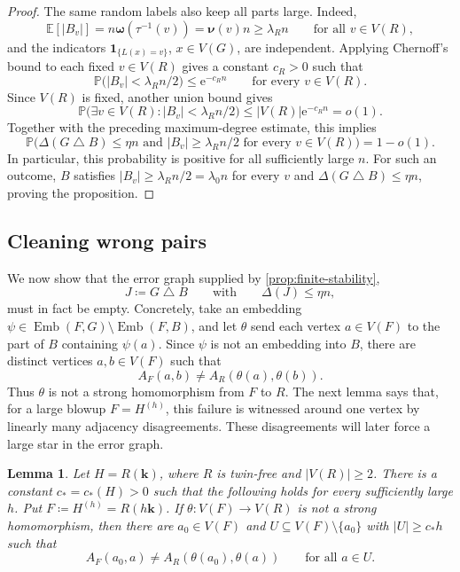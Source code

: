 \documentclass[10pt]{article}
\theoremstyle{plain}
\newtheorem{lemma}[lemma]{Lemma}
\theoremstyle{remark}
\DeclareMathOperator{\Emb}{Emb}
\newcommand{\symdiff}{\mathbin{\triangle}}
\newcommand{\bnu}{{\boldsymbol{\nu}}}
\newcommand{\bomega}{{\boldsymbol{\omega}}}
\begin{document}
\begin{proof}
The same random labels also keep all parts large. Indeed,
\[
        \mathbb E[|B_v|]=n\bomega(\tau^{-1}(v))=\bnu(v)n\ge\lambda_R n
        \qquad\text{for all }v\in V(R),
\]
and the indicators $\mathbf 1_{\{L(x)=v\}}$, $x\in V(G)$, are independent. Applying Chernoff's bound to each fixed $v\in V(R)$ gives a constant $c_R>0$ such that
\[
        \mathbb P\bigl(|B_v|<\lambda_R n/2\bigr)
        \le \mathrm{e}^{-c_R n}
        \qquad\text{for every }v\in V(R).
\]
Since $V(R)$ is fixed, another union bound gives
\[
        \mathbb P\bigl(\exists v\in V(R): |B_v|<\lambda_R n/2\bigr)
        \le |V(R)|\mathrm{e}^{-c_R n}=o(1).
\]
Together with the preceding maximum-degree estimate, this implies
\[
        \mathbb P\bigl(\Delta(G\symdiff B)\le\eta n
        \text{ and } |B_v|\ge\lambda_R n/2\text{ for every }v\in V(R)\bigr)
        =1-o(1).
\]
In particular, this probability is positive for all sufficiently large $n$. For such an outcome, $B$ satisfies $|B_v|\ge\lambda_R n/2=\lambda_0 n$ for every $v$ and $\Delta(G\symdiff B)\le\eta n$, proving the proposition.
\end{proof}

\subsection{Cleaning wrong pairs}
\label{sec:cleaning}

We now show that the error graph supplied by \cref{prop:finite-stability},
\[
        J\coloneqq G\symdiff B
        \qquad\text{with}\qquad
        \Delta(J)\le\eta n,
\]
must in fact be empty. Concretely, take an embedding $\psi\in\Emb(F,G)\setminus\Emb(F,B)$, and let $\theta$ send each vertex $a\in V(F)$ to the part of $B$ containing $\psi(a)$. Since $\psi$ is not an embedding into $B$, there are distinct vertices $a,b\in V(F)$ such that
\[
        A_F(a,b)\ne A_R(\theta(a),\theta(b)).
\]
Thus $\theta$ is not a strong homomorphism from $F$ to $R$. The next lemma says that, for a large blowup $F=H^{(h)}$, this failure is witnessed around one vertex by linearly many adjacency disagreements. These disagreements will later force a large star in the error graph.

\begin{lemma}
\label{lem:many-forced-errors}
Let $H=R(\mathbf k)$, where $R$ is twin-free and $|V(R)|\ge2$. There is a constant $c_*=c_*(H)>0$ such that the following holds for every sufficiently large $h$. Put $F\coloneqq H^{(h)}=R(h\mathbf k)$. If $\theta:V(F)\to V(R)$ is not a strong homomorphism, then there are $a_0\in V(F)$ and $U\subseteq V(F)\setminus\{a_0\}$ with $|U|\ge c_*h$ such that
\[
        A_F(a_0,a)\ne A_R(\theta(a_0),\theta(a))
        \qquad\text{for all }a\in U.
\]
\end{lemma}
\end{document}
